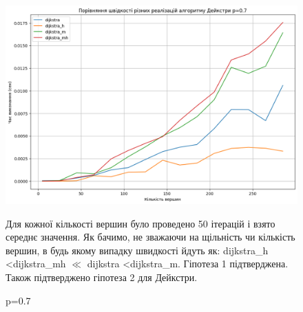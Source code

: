 \documentclass[a4paper,12pt]{article}
\begin{document}
\begin{figure}[ht]
    
    \vspace{10pt} 
    \begin{minipage}{0.45\textwidth}
        \centering
        \includegraphics[width=\textwidth]{img/alldijkstra07.png}
        \caption{p=0.7}
        \label{fig:alldijkstra07}
    \end{minipage}

    Для кожної кількості вершин було проведено 50 ітерацій і взято середнє значення. Як бачимо, не зважаючи на щільність чи кількість вершин, в будь якому випадку швидкості йдуть як: 
    dijkstra\_h \textless dijkstra\_mh $\ll$ dijkstra \textless dijkstra\_m. Гіпотеза 1 підтверджена. Також підтверджено гіпотеза 2 для Дейкстри.
\end{figure}
\end{document}
